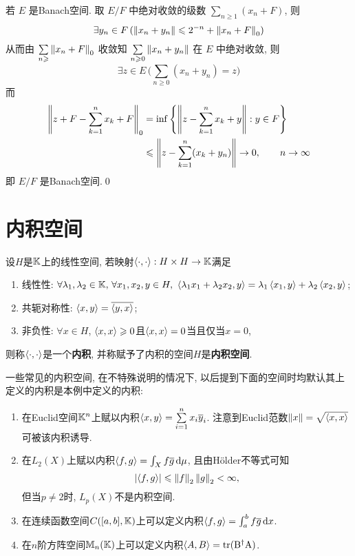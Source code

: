 \begin{Proof}
        若 $ E $ 是Banach空间. 取 $ E/F $ 中绝对收敛的级数 $ \sum\limits_{n\geqslant1}(x_{n}+F) $, 则
        \[
            \exists y_{n}\in F\,(\left\| x_{n}+y_{n} \right\|\leqslant 2^{-n}+\left\| x_{n}+F \right\|_{0})
        \]
        从而由 $ \sum\limits_{n\geqslant}\left\| x_{n}+F \right\|_{0} $ 收敛知 $ \sum\limits_{n\geqslant0}\left\| x_{n}+y_{n} \right\| $ 在 $ E $ 中绝对收敛, 则
        \[
            \exists z\in E\,\bigg( \sum_{n\geqslant0}(x_{n}+y_{n})=z \bigg)
        \]
        而 
        \[
            \begin{aligned}
                \left\| z+F-\sum_{k=1}^{n}x_{k}+F \right\|_{0} & =\inf\left\{ \left\| z-\sum_{k=1}^{n}x_{k}+y \right\|:y\in F \right\}\\
                & \leqslant \left\| z-\sum_{k=1}^{n}(x_{k}+y_{n}) \right\|\to 0,\qquad n\to\infty
            \end{aligned}
        \]
        即 $ E/F $ 是Banach空间.\qed
    \end{Proof}
    
\section{内积空间}
    
    \begin{Definition}[内积空间]
    设$ H $是$ \mathbb{K} $上的线性空间, 若映射$ \left\langle \cdot,\cdot \right\rangle : H\times H\to\mathbb{K} $满足
    \begin{enumerate}[(1)]
    \item 线性性: $ \forall \lambda_1,\lambda_2\in\K,\,\forall x_1,x_2,y\in H,\ \lrangle{\lambda_1x_1+\lambda_2x_2,y}=\lambda_1\lrangle{x_1,y}+\lambda_2\lrangle{x_2,y} $;
    \item 共轭对称性: $ \left\langle x,y \right\rangle=\overline{\left\langle y,x \right\rangle} $;
    \item 非负性: $ \forall x\in H $, $ \left\langle x,x \right\rangle\geqslant 0 $且$ \left\langle x,x \right\rangle=0 $当且仅当$ x=0 $,
    \end{enumerate}
    则称$ \left\langle \cdot,\cdot \right\rangle $是一个\textbf{内积}, 并称赋予了内积的空间$ H $是\textbf{内积空间}.
    \end{Definition}
    
    \begin{Example}
    一些常见的内积空间, 在不特殊说明的情况下, 以后提到下面的空间时均默认其上定义的内积是本例中定义的内积:
    \begin{enumerate}[(1)]
    \item 在Euclid空间$ \mathbb{K}^n $上赋以内积$ \left\langle x,y \right\rangle=\sum\limits_{i=1}^nx_i\overline{y}_i $. 注意到Euclid范数$ \left\| x \right\|=\sqrt{\left\langle x,x \right\rangle} $可被该内积诱导.
    \item 在$ L_2(X) $上赋以内积$ \left\langle f,g \right\rangle=\int_Xf\overline{g}\,\mathrm{d}\mu $, 且由H\"older不等式可知
    \[
    \left| \left\langle f,g \right\rangle \right| \leqslant\left\| f \right\|_2\left\| g \right\|_2<\infty,
    \]
    但当$ p\ne 2 $时, $ L_p(X) $不是内积空间.
    \item 在连续函数空间$ C([a,b],\mathbb{K}) $上可以定义内积$ \left\langle f,g \right\rangle=\int_a^bf\overline{g}\,\mathrm{d} x $.
    \item 在$ n $阶方阵空间$ \mathbb{M}_n(\mathbb{K}) $上可以定义内积$ \left\langle A,B \right\rangle=\mathrm{tr(B^\dagger A)} $.
    \end{enumerate}
    \end{Example}
    
